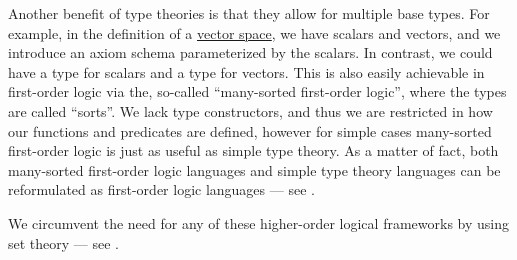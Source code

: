 \begin{remark}
  Another benefit of type theories is that they allow for multiple base types. For example, in the definition of a \hyperref[def:vector_space]{vector space}, we have scalars and vectors, and we introduce an axiom schema parameterized by the scalars. In contrast, we could have a type for scalars and a type for vectors. This is also easily achievable in first-order logic via the, so-called \enquote{many-sorted first-order logic}, where the types are called \enquote{sorts}. We lack type constructors, and thus we are restricted in how our functions and predicates are defined, however for simple cases many-sorted first-order logic is just as useful as simple type theory. As a matter of fact, both many-sorted first-order logic languages and simple type theory languages can be reformulated as first-order logic languages --- see \cite[ch. 8]{Farmer2008}.

  We circumvent the need for any of these higher-order logical frameworks by using set theory --- see .
\end{remark}
